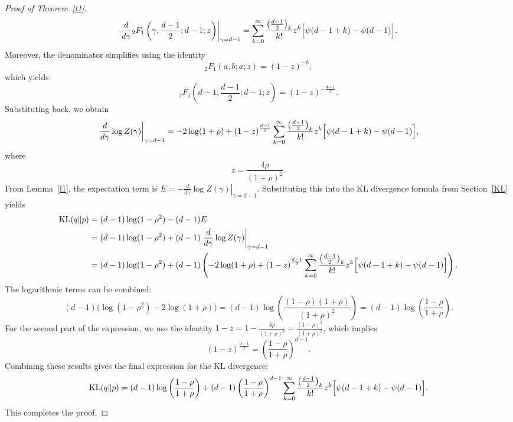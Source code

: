 \documentclass{article}
\begin{document}
\begin{proof}[Proof of Theorem~\ref{t1}]
\begin{equation*}
    \left. \frac{d}{d\gamma} {}_2F_1\left(\gamma, \frac{d-1}{2}; d-1; z \right) \right|_{\gamma = d-1} = \sum_{k=0}^{\infty} \frac{\left(\frac{d-1}{2}\right)_k}{k!}  z^k \Bigl[ \psi(d-1+k) - \psi(d-1) \Bigr].
\end{equation*}
Moreover, the denominator simplifies using the identity \cite[15.4.6]{watson:DLMF}
\begin{equation*}
    {}_2F_1(a, b; a; z) = (1-z)^{-b},
\end{equation*}
which yields
\begin{equation*}
    {}_2F_1\left(d-1, \frac{d-1}{2}; d-1; z \right) = (1 - z)^{-\frac{d-1}{2}}.
\end{equation*}
Substituting back, we obtain
\begin{equation*}
    \left. \frac{d}{d\gamma} \log Z(\gamma) \right|_{\gamma=d-1} = -2\log(1+\rho) + \left(1 - z\right)^{\frac{d-1}{2}} \sum_{k=0}^{\infty} \frac{\left(\frac{d-1}{2}\right)_k}{k!}  z^k \Bigl[ \psi(d-1+k) - \psi(d-1) \Bigr],
\end{equation*}
where
\begin{equation*}
    z = \frac{4\rho}{(1+\rho)^2}.
\end{equation*}
From Lemma~\ref{l1}, the expectation term is \(E = -\left.\frac{d}{d\gamma}\log Z(\gamma)\right|_{\gamma=d-1}\). Substituting this into the KL divergence formula from Section~\ref{KL} yields
\begin{align*}
\mathrm{KL}(q\|p) &= (d-1)\log(1-\rho^2) - (d-1)E \\
&= (d-1)\log(1-\rho^2) + (d-1)\left.\frac{d}{d\gamma}\log Z(\gamma)\right|_{\gamma=d-1} \\
&= (d-1)\log(1-\rho^2) + (d-1)\left( -2\log(1+\rho) + \left(1-z\right)^{\frac{d-1}{2}} \sum_{k=0}^{\infty} \frac{\left(\frac{d-1}{2}\right)_k}{k!} z^k \Bigl[ \psi(d-1+k) - \psi(d-1) \Bigr] \right).
\end{align*}
The logarithmic terms can be combined:
\[
(d-1)\bigl( \log(1-\rho^2) - 2\log(1+\rho) \bigr) = (d-1)\log\left(\frac{(1-\rho)(1+\rho)}{(1+\rho)^2}\right) = (d-1)\log\left(\frac{1-\rho}{1+\rho}\right).
\]
For the second part of the expression, we use the identity \(1-z = 1 - \frac{4\rho}{(1+\rho)^2} = \frac{(1-\rho)^2}{(1+\rho)^2}\), which implies
\[
\left(1-z\right)^{\frac{d-1}{2}} = \left(\frac{1-\rho}{1+\rho}\right)^{d-1}.
\]
Combining these results gives the final expression for the KL divergence:
\[
\mathrm{KL}(q\|p) = (d-1)\log\left(\frac{1-\rho}{1+\rho}\right) + (d-1)\left(\frac{1-\rho}{1+\rho}\right)^{d-1} \sum_{k=0}^{\infty} \frac{\left(\frac{d-1}{2}\right)_k}{k!} z^k \Bigl[ \psi(d-1+k) - \psi(d-1) \Bigr].
\]
This completes the proof.
\end{proof}
\end{document}
